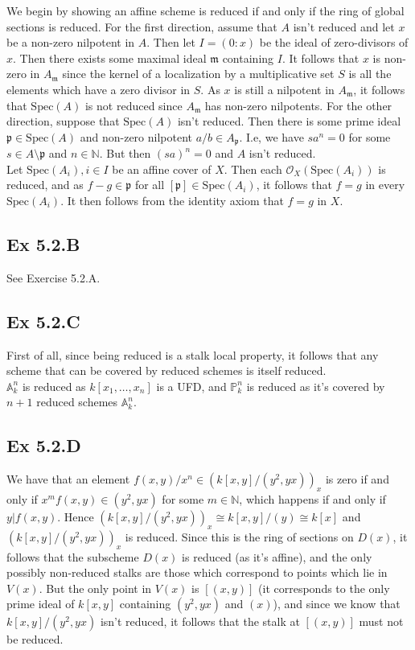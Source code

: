 \documentclass{article}
\theoremstyle{definition}
\renewcommand{\P}{\mathbb{P}}
\newcommand{\N}{\mathbb{N}}
\newcommand{\A}{\mathbb{A}}
\newcommand{\oo}{\mathcal{O}}
\newcommand{\Spec}{\text{Spec}}
\begin{document}
We begin by showing an affine scheme is reduced if and only if the ring of
global sections is reduced. For the first direction, assume that $A$ isn't
reduced and let $x$ be a non-zero nilpotent in $A$. Then let $I = (0 : x)$ be
the ideal of zero-divisors of $x$. Then there exists some maximal ideal
$\mathfrak{m}$ containing $I$. It follows that $x$ is non-zero in
$A_{\mathfrak{m}}$ since the kernel of a localization by a multiplicative set
$S$ is all the elements which have a zero divisor in $S$. As $x$ is still a
nilpotent in $A_{\mathfrak{m}}$, it follows that $\Spec(A)$ is not reduced
since $A_{\mathfrak{m}}$ has non-zero nilpotents. For the other direction,
suppose that $\Spec(A)$ isn't reduced. Then there is some prime ideal
$\mathfrak{p} \in \Spec(A)$ and non-zero nilpotent $a/b \in A_{\mathfrak{p}}$.
I.e, we have $s a^{n} = 0$ for some $s \in A \setminus \mathfrak{p}$ and $n \in
\N$. But then $(sa)^n = 0$ and $A$ isn't reduced. \\

Let $\Spec(A_i), i \in I$ be an affine cover of $X$. Then each
$\oo_X(\Spec(A_i))$ is reduced, and as $f - g \in \mathfrak{p}$ for all
$[\mathfrak{p}] \in \Spec(A_i)$, it follows that $f = g$ in every $\Spec(A_i)$.
It then follows from the identity axiom that $f = g$ in $X$. \\

\subsection*{Ex 5.2.B}

See Exercise 5.2.A.

\subsection*{Ex 5.2.C}

First of all, since being reduced is a stalk local property, it follows that any
scheme that can be covered by reduced schemes is itself reduced. \\

$\A_{k}^{n}$ is reduced as $k[x_1,\ldots,x_n]$ is a UFD, and $\P_{k}^{n}$ is
reduced as it's covered by $n + 1$ reduced schemes $\A_{k}^{n}$. 

\subsection*{Ex 5.2.D}

We have that an element $f(x, y)/x^n \in (k[x, y]/(y^2, yx))_x$ is zero if and
only if $x^m f(x, y) \in (y^2, yx)$ for some $m \in \N$, which happens if and
only if $y | f(x, y)$. Hence $(k[x, y]/(y^2, yx))_x \cong k[x, y] / (y) \cong
k[x]$ and $(k[x, y]/(y^2, yx))_x$ is reduced. Since this is the ring of
sections on $D(x)$, it follows that the subscheme $D(x)$ is reduced (as it's
affine), and the only possibly non-reduced stalks are those which correspond to
points which lie in $V(x)$. But the only point in $V(x)$ is $[(x, y)]$ (it
corresponds to the only prime ideal of $k[x, y]$ containing $(y^2, yx)$ and
$(x)$), and since we know that $k[x, y]/(y^2, yx)$ isn't reduced, it follows
that the stalk at $[(x, y)]$ must not be reduced.
\end{document}
